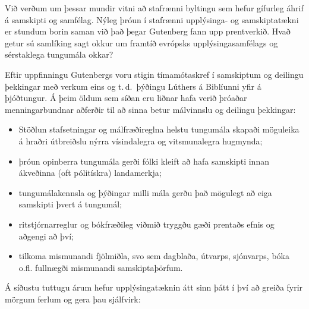\documentclass{../../metanetpaper}
\begin{document}

\begin{multicols}{2}

Við verðum um þessar mundir vitni að stafrænni byltingu sem hefur gífurleg áhrif á samskipti og samfélag. Nýleg þróun í stafrænni upplýsinga- og samskiptatækni er stundum borin saman við það þegar Gutenberg fann upp prentverkið. Hvað getur sú samlíking sagt okkur um framtíð evrópsks upplýsingasamfélags og sérstaklega tungumála okkar?


Eftir uppfinningu Gutenbergs voru stigin tímamótaskref í samskiptum og deilingu þekkingar með verkum eins og t.\,d.~þýðingu Lúthers á Biblíunni yfir á þjóðtungur. Á þeim öldum sem síðan eru liðnar hafa verið þróaðar menningarbundnar aðferðir til að sinna betur málvinnslu og deilingu þekkingar:

\begin{itemize}
\item Stöðlun stafsetningar og málfræðireglna helstu tungumála skapaði möguleika á hraðri útbreiðslu nýrra vísindalegra og vitsmunalegra hugmynda;
\item þróun opinberra tungumála gerði fólki kleift að hafa samskipti innan ákveðinna (oft pólitískra) landamerkja;
\item tungumálakennsla og þýðingar milli mála gerðu það mögulegt að eiga samskipti þvert á tungumál;
\item ritstjórnarreglur og bókfræðileg viðmið tryggðu gæði prentaðs efnis og aðgengi að því;
\item tilkoma mismunandi fjölmiðla, svo sem dagblaða, útvarps, sjónvarps, bóka o.fl. fullnægði mismunandi samskiptaþörfum.
\end{itemize}

Á síðustu tuttugu árum hefur upplýsingatæknin átt sinn þátt í því að greiða fyrir mörgum ferlum og gera þau sjálfvirk:


\end{multicols}
\end{document}
